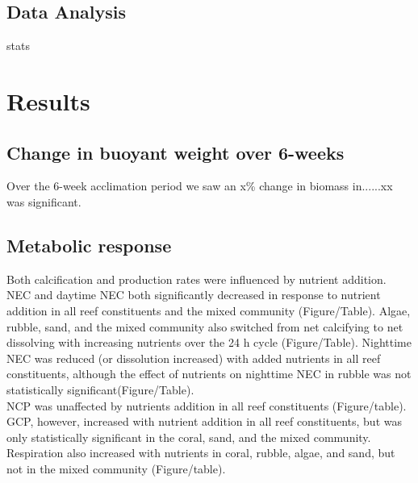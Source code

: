 \documentclass[]{rsos}%
\begin{document}
\subsection{Data Analysis}
stats

\section{Results}
\subsection{Change in buoyant weight over 6-weeks}
Over the 6-week acclimation period we saw an x\% change in biomass in......xx was significant.\\
\subsection{Metabolic response}
Both calcification and production rates were influenced by nutrient addition. NEC and daytime NEC both significantly decreased in response to nutrient addition in all reef constituents and the mixed community (Figure/Table). Algae, rubble, sand, and the mixed community also switched from net calcifying to net dissolving with increasing nutrients over the 24 h cycle (Figure/Table). Nighttime NEC was reduced (or dissolution increased) with added nutrients in all reef constituents, although the effect of nutrients on nighttime NEC in rubble was not statistically significant(Figure/Table). \\
\indent  NCP was unaffected by nutrients addition in all reef constituents (Figure/table). GCP, however, increased with nutrient addition in all reef constituents, but was only statistically significant in the coral, sand, and the mixed community. Respiration also increased with nutrients in coral, rubble, algae, and sand, but not in the mixed community (Figure/table). 
\end{document}
